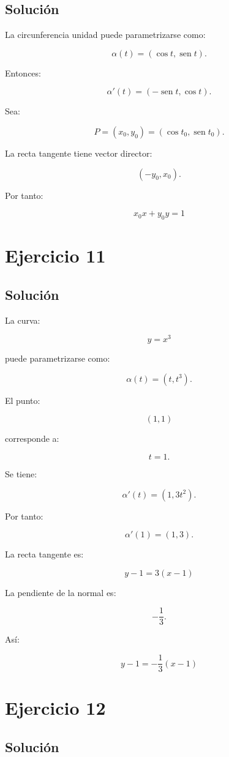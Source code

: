 \documentclass[11pt,a4paper]{article}
\newcommand{\sen}{\operatorname{sen}}
\begin{document}
\subsection{Solución}

La circunferencia unidad puede parametrizarse como:

\[
\alpha(t)
=
(\cos t,\sen t).
\]

Entonces:

\[
\alpha'(t)
=
(-\sen t,\cos t).
\]

Sea:

\[
P=(x_0,y_0)
=
(\cos t_0,\sen t_0).
\]

La recta tangente tiene vector director:

\[
(-y_0,x_0).
\]

Por tanto:

\[
\boxed{
x_0x+y_0y=1
}
\]

\section{Ejercicio 11}
\subsection{Solución}

La curva:

\[
y=x^3
\]

puede parametrizarse como:

\[
\alpha(t)
=
(t,t^3).
\]

El punto:

\[
(1,1)
\]

corresponde a:

\[
t=1.
\]

Se tiene:

\[
\alpha'(t)
=
(1,3t^2).
\]

Por tanto:

\[
\alpha'(1)
=
(1,3).
\]

La recta tangente es:

\[
\boxed{
y-1=3(x-1)
}
\]

La pendiente de la normal es:

\[
-\frac13.
\]

Así:

\[
\boxed{
y-1
=
-\frac13(x-1)
}
\]

\section{Ejercicio 12}
\subsection{Solución}
\end{document}
